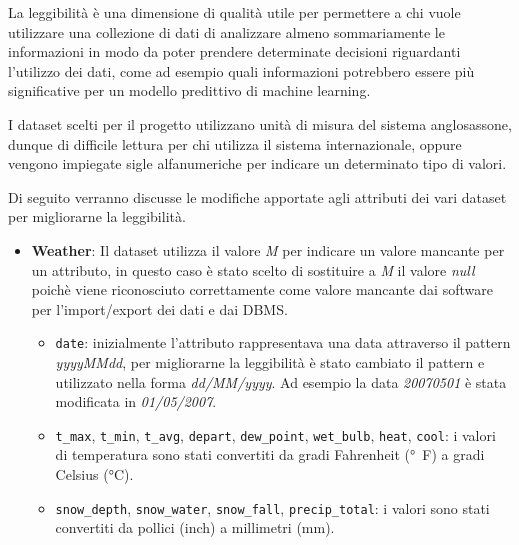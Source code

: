 La leggibilità è una dimensione di qualità utile per permettere a chi vuole 
utilizzare una collezione di dati di analizzare almeno sommariamente le 
informazioni in modo da poter prendere determinate decisioni riguardanti 
l'utilizzo dei dati, come ad esempio quali informazioni potrebbero essere più 
significative per un modello predittivo di machine learning.

I dataset scelti per il progetto utilizzano unità di misura del sistema 
anglosassone, dunque di difficile lettura per chi utilizza il sistema 
internazionale, oppure vengono impiegate sigle alfanumeriche per indicare un 
determinato tipo di valori. 

Di seguito verranno discusse le modifiche apportate agli attributi dei vari 
dataset per migliorarne la leggibilità.

\begin{itemize}

    \item \textbf{Weather}: Il dataset utilizza il valore \textit{M} per 
        indicare un valore mancante per un attributo, in questo caso è stato 
        scelto di sostituire a \textit{M} il valore \textit{null} poichè viene 
        riconosciuto correttamente come valore mancante dai software per 
        l'import/export dei dati e dai DBMS.
        
        \begin{itemize}
            
            \item \texttt{date}: inizialmente l'attributo rappresentava una 
                data attraverso il pattern \textit{yyyyMMdd}, per migliorarne 
                la leggibilità è stato cambiato il pattern e utilizzato nella 
                forma \textit{dd/MM/yyyy}. Ad esempio la data 
                \textit{20070501} è stata modificata in \textit{01/05/2007}.
        
            \item \texttt{t\_max}, \texttt{t\_min},  \texttt{t\_avg}, \texttt{depart}, 
            	\texttt{dew\_point}, \texttt{wet\_bulb}, \texttt{heat}, 
            	\texttt{cool}: i valori di temperatura sono stati convertiti da 
            	gradi Fahrenheit (\si{\degree F}) a gradi Celsius 
            	(\si{\celsius}).

           	\item \texttt{snow\_depth}, \texttt{snow\_water}, \texttt{snow\_fall}, 
           		\texttt{precip\_total}: i valori sono stati convertiti da pollici
           		(inch) a millimetri (mm).


\end{itemize}
\end{itemize}
